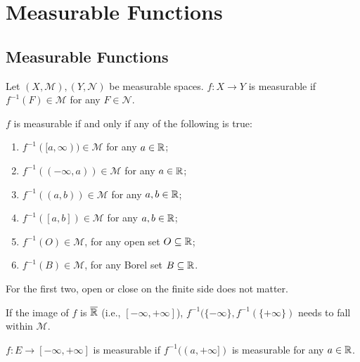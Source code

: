 \documentclass[class=book, crop=false]{standalone}
\begin{document}
    \section{Measurable Functions}
        \subsection{Measurable Functions}
        \begin{definition}
            Let $(X, \mathcal{M}), (Y, \mathcal{N})$ be measurable spaces. $f : X \rightarrow Y$ is measurable if $f^{-1}(F) \in \mathscr{M}$ for any $F \in \mathcal{N}$.
        \end{definition}

        \begin{theorem}
            $f$ is measurable if and only if any of the following is true:
            \begin{enumerate}
                \item $f^{-1}([a, \infty)) \in \mathcal{M}$ for any $a \in \mathbb{R}$;
                \item $f^{-1}((-\infty, a)) \in \mathcal{M}$ for any $a \in \mathbb{R}$;
                \item $f^{-1}((a, b)) \in \mathcal{M}$ for any $a, b \in \mathbb{R}$;
                \item $f^{-1}([a, b]) \in \mathcal{M}$ for any $a, b \in \mathbb{R}$;
                \item $f^{-1}(O) \in \mathcal{M}$, for any open set $O \subseteq \mathbb{R}$;
                \item $f^{-1}(B) \in \mathcal{M}$, for any Borel set $B \subseteq \mathbb{R}$.
            \end{enumerate}
        \end{theorem}
        \begin{remark}
            For the first two, open or close on the finite side does not matter.
        \end{remark}
        \begin{remark}
            If the image of $f$ is $\overline{\mathbb{R}}$ (i.e., $[-\infty, +\infty]$), $f^{-1}(\{-\infty\}, f^{-1}(\{+\infty\})$ needs to fall within $\mathcal{M}$.
        \end{remark}

        \begin{theorem}
            $f : E \rightarrow [-\infty, +\infty]$ is measurable if $f^{-1}((a, +\infty])$ is measurable for any $a \in \mathbb{R}$.
        \end{theorem}
\end{document}
